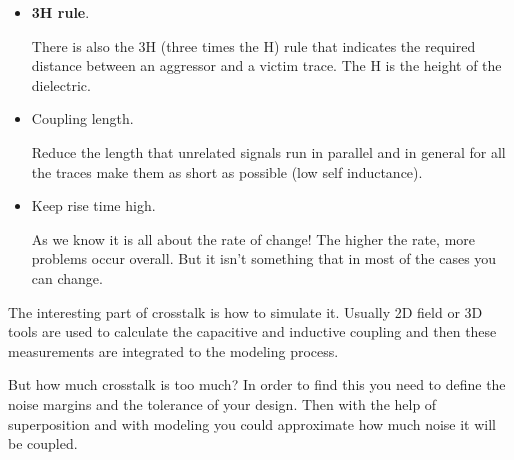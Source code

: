 \documentclass[12pt]{article}
\begin{document}
\begin{itemize}
	\item \textbf{3H rule}.
	
There is also the 3H (three times the H) rule that indicates the required distance between an aggressor and a victim trace. The H is the height of the dielectric.
	
	\item Coupling length.
	
Reduce the length that unrelated signals run in parallel and in general for all the traces make them as short as possible (low self inductance).

	\item Keep rise time high.
	
As we know it is all about the rate of change! The higher the rate, more problems occur overall. But it isn't something that in most of the cases you can change.
\end{itemize}

The interesting part of crosstalk is how to simulate it. Usually 2D field or 3D tools are used to calculate the capacitive and inductive coupling and then these measurements are integrated to the modeling process. 

But how much crosstalk is too much? In order to find this you need to define the noise margins and the tolerance of your design. Then with the help of superposition and with modeling you could approximate how much noise it will be coupled.


\end{document}
